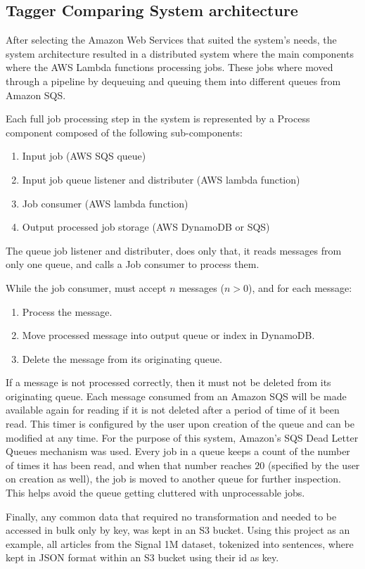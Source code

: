 \subsection{Tagger Comparing System architecture}
After selecting the Amazon Web Services that suited the system's needs, the system architecture resulted in a distributed system where the main components where the AWS Lambda functions processing jobs.
These jobs where moved through a pipeline by dequeuing and queuing them into different queues from Amazon SQS.

Each full job processing step in the system is represented by a Process component composed of the following sub-components:
\begin{enumerate}
\item Input job (AWS SQS queue)
\item Input job queue listener and distributer (AWS lambda function)
\item Job consumer (AWS lambda function)
\item Output processed job storage (AWS DynamoDB or SQS)
\end{enumerate}
The queue job listener and distributer, does only that, it reads messages from only one queue, and calls a Job consumer to process them.

While the job consumer, must accept $n$ messages ($n > 0$), and for each message:
\begin{enumerate}
\item Process the message.
\item Move processed message into output queue or index in DynamoDB.
\item Delete the message from its originating queue.
\end{enumerate}

If a message is not processed correctly, then it must not be deleted from its originating queue.
Each message consumed from an Amazon SQS will be made available again for reading if it is not deleted after a period of time of it been read.
This timer is configured by the user upon creation of the queue and can be modified at any time.
For the purpose of this system, Amazon's SQS Dead Letter Queues mechanism was used.
Every job in a queue keeps a count of the number of times it has been read, and when that number reaches $20$ (specified by the user on creation as well), the job is moved to another queue for further inspection. This helps avoid the queue getting cluttered with unprocessable jobs. 

Finally, any common data that required no transformation and needed to be accessed in bulk only by key, was kept in an S3 bucket.
Using this project as an example, all articles from the Signal 1M dataset, tokenized into sentences, where kept in JSON format within an S3 bucket using their id as key.

